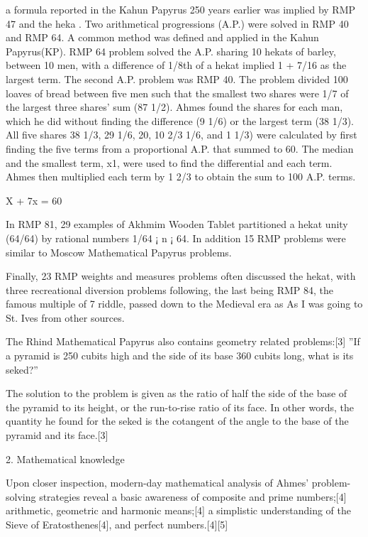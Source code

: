 \documentclass[12pt]{article}
\begin{document}
a formula reported in the Kahun Papyrus 250 years earlier was implied by RMP 47 and the heka .
Two arithmetical progressions (A.P.) were solved in RMP 40 and RMP 64. A common method was defined and applied in the Kahun Papyrus(KP). RMP 64 problem solved the A.P. sharing 10 hekats of barley, between 10 men, with a difference of 1/8th of a hekat implied 1 + 7/16 as the largest term.
The second A.P. problem was RMP 40. The problem divided 100 loaves of bread between five men such that the smallest two shares were 1/7 of the largest three shares’ sum (87 1/2). Ahmes found the shares for each man, which he did without finding the difference (9 1/6) or the largest term (38 1/3). All five shares 38 1/3, 29 1/6, 20, 10 2/3 1/6, and 1 1/3) were calculated by first finding the five terms from a proportional A.P. that summed to 60. The median and the smallest term, x1, were used to find the differential and each term. Ahmes then multiplied each term by 1 2/3 to obtain the sum to 100 A.P. terms. 
                                                                            
                                                                           X + 7x  =  60
                                                                           
In RMP 81, 29 examples of Akhmim Wooden Tablet partitioned a hekat unity (64/64) by rational numbers 1/64 ¡ n ¡ 64. In addition 15 RMP problems were similar to Moscow Mathematical Papyrus problems. 

Finally, 23 RMP weights and measures problems often discussed the hekat, with three recreational diversion problems following, the last being RMP 84, the famous multiple of 7 riddle, passed down to the Medieval era as As I was going to St. Ives from other sources.

The Rhind Mathematical Papyrus also contains geometry related problems:[3]
”If a pyramid is 250 cubits high and the side of its base 360 cubits long, what is its seked?”

The solution to the problem is given as the ratio of half the side of the base of the pyramid to its height, or the run-to-rise ratio of its face. In other words, the quantity he found for the seked is the cotangent of the angle to the base of the pyramid and its face.[3]

2. Mathematical knowledge

Upon closer inspection, modern-day mathematical analysis of Ahmes’ problem-solving strategies reveal a basic awareness of composite and prime numbers;[4] arithmetic, geometric and harmonic means;[4] a simplistic understanding of the Sieve of Eratosthenes[4], and perfect numbers.[4][5]
\end{document}
